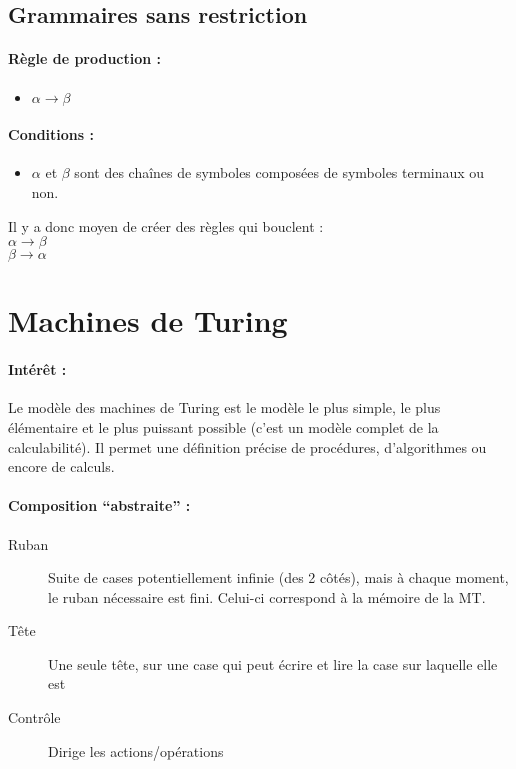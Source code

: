\subsection{Grammaires sans restriction}

\paragraph{Règle de production :}
\begin{itemize}
	\item $\alpha \rightarrow \beta$
\end{itemize}

\paragraph{Conditions :}

\begin{itemize}
	\item $\alpha$ et $\beta$ sont des chaînes de symboles composées de
		symboles terminaux ou non.
\end{itemize}

\begin{myexem}
	Il y a donc moyen de créer des règles qui bouclent : \\
	$\alpha \rightarrow \beta$ \\
	$\beta \rightarrow \alpha$\\
\end{myexem}

\section{Machines de Turing}
\paragraph{Intérêt :}Le modèle des machines de Turing est le modèle le plus
simple, le plus élémentaire et le plus puissant possible (c'est un modèle
complet de la calculabilité). Il permet une définition précise de procédures,
d'algorithmes ou encore de calculs.

\paragraph{Composition ``abstraite'' :}
\begin{description}
	\item[Ruban] Suite de cases potentiellement infinie (des 2 côtés), mais à
		chaque moment, le ruban nécessaire est fini. Celui-ci correspond à la mémoire de la MT.
	\item[Tête] Une seule tête, sur une case qui peut écrire et lire la
		case sur laquelle elle est
	\item[Contrôle] Dirige les actions/opérations
\end{description}

